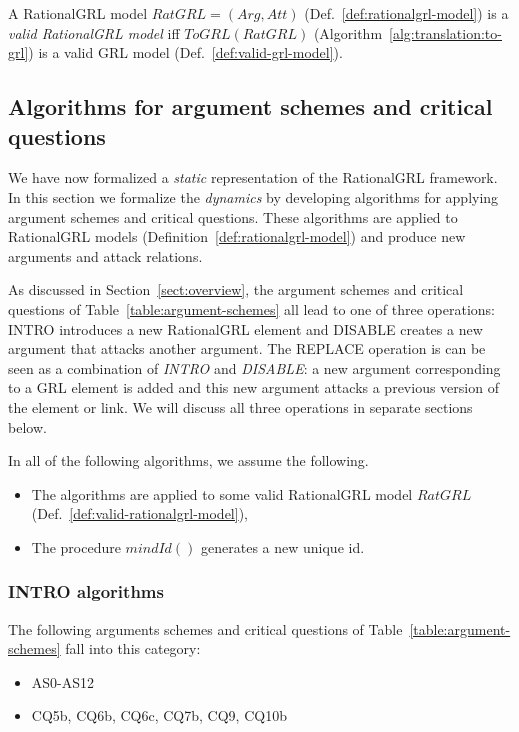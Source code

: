 \begin{definition}
\label{def:valid-rationalgrl-model}
A RationalGRL model $RatGRL = (Arg, Att)$ (Def.~\ref{def:rationalgrl-model})
is a \emph{valid RationalGRL model} iff $ToGRL(RatGRL)$ (Algorithm~\ref{alg:translation:to-grl}) is a valid GRL model (Def.~\ref{def:valid-grl-model}).
\end{definition}

\subsection{Algorithms for argument schemes and critical questions}
\label{sect:algorithms}

We have now formalized a \emph{static} representation of the RationalGRL framework. In this section we formalize the \emph{dynamics} by developing algorithms for applying argument schemes and critical questions. These algorithms are applied to RationalGRL models (Definition~\ref{def:rationalgrl-model}) and produce new arguments and attack relations. 

As discussed in Section~\ref{sect:overview}, the argument schemes and critical questions of Table~\ref{table:argument-schemes} all lead to one of three operations: \textsf{INTRO}
introduces a new RationalGRL element and \textsf{DISABLE} creates a new argument that attacks another argument. The \textsf{REPLACE} operation is can be seen as a combination of \emph{INTRO} and \emph{DISABLE}: a new argument corresponding to a GRL element is added and this new argument attacks a previous version of the element or link. We will discuss all three operations in separate sections below.

In all of the following algorithms, we assume the following.
\begin{itemize}
\item The algorithms are applied to some valid RationalGRL model $RatGRL$ (Def.~\ref{def:valid-rationalgrl-model}),
\item The procedure $mindId()$ generates a new unique id.
\end{itemize}

\subsubsection{INTRO algorithms}

The following arguments schemes and critical questions of Table~\ref{table:argument-schemes} fall into this category:
\begin{itemize}
\item AS0-AS12
\item CQ5b, CQ6b, CQ6c, CQ7b, CQ9, CQ10b
\end{itemize}


